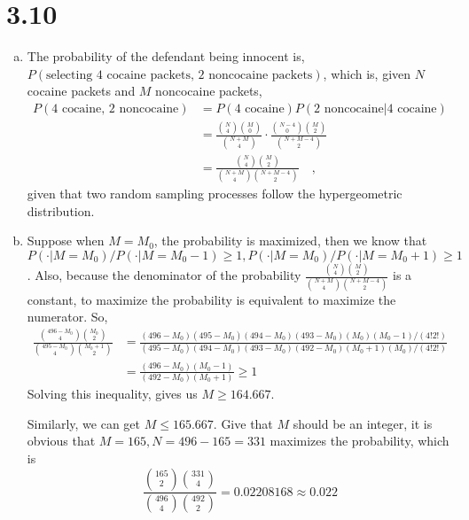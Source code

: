 \documentclass[letterpaper]{article}
\begin{document}
    \section*{3.10}
    \begin{enumerate}[(a)]
    \item The probability of the defendant being innocent is, 
    $P(\text{selecting 4 cocaine packets, 2 noncocaine packets})$, which is, given $N$ cocaine packets and $M$ noncocaine packets,
    \begin{align*}
    P(\text{4 cocaine, 2 noncocaine}) &= P(\text{4 cocaine})P(\text{2 noncocaine}|\text{4 cocaine}) \\
    &= \frac{\binom{N}{4}\binom{M}{0}}{\binom{N+M}{4}} \cdot 
    \frac{\binom{N-4}{0}\binom{M}{2}}{\binom{N+M-4}{2}} \\
    &= \frac{\binom{N}{4}\binom{M}{2}}{\binom{N+M}{4}\binom{N+M-4}{2}}\quad,
    \end{align*}
    given that two random sampling processes follow the hypergeometric distribution.
    \item Suppose when $M=M_0$, the probability is maximized, then we know that $P(\cdot|M=M_0)/P(\cdot|M=M_0-1) \ge 1, P(\cdot|M=M_0)/P(\cdot|M=M_0+1) \ge 1$.
    Also, because the denominator of the probability
    $\frac{\binom{N}{4}\binom{M}{2}}{\binom{N+M}{4}\binom{N+M-4}{2}}$ is a constant, to maximize the probability is equivalent to maximize the numerator. So,
    \begin{align*}
    \frac{\binom{496-M_0}{4}\binom{M_0}{2}}{\binom{495-M_0}{4}\binom{M_0+1}{2}} &= \frac{(496-M_0)(495-M_0)(494-M_0)(493-M_0)(M_0)(M_0-1)/(4!2!)}
    {(495-M_0)(494-M_0)(493-M_0)(492-M_0)(M_0+1)(M_0)/(4!2!)}\\
    &= \frac{(496-M_0)(M_0-1)}{(492-M_0)(M_0+1)} \ge 1
    \end{align*}
    Solving this inequality, gives us $M \ge 164.667$.

    Similarly, we can get $M \le 165.667$. Give that $M$ should be an integer, it is obvious that $M=165, N=496-165 = 331$ maximizes the probability, which is 
    \[
    \frac{\binom{165}{2}\binom{331}{4}}{\binom{496}{4}\binom{492}{2}} = 0.02208168 \approx 0.022 
    \]
    \end{enumerate}
\end{document}
